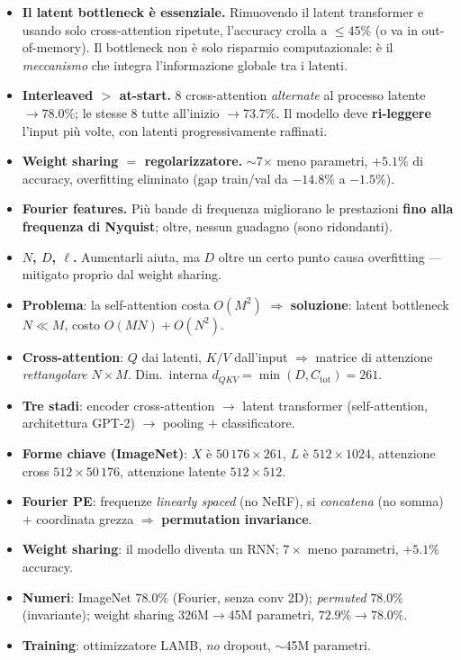 \documentclass[11pt]{article}
\begin{document}
\begin{itemize}
\item \textbf{Il latent bottleneck è essenziale.} Rimuovendo il latent transformer e usando solo cross-attention ripetute, l'accuracy crolla a $\le 45\%$ (o va in out-of-memory). Il bottleneck non è solo risparmio computazionale: è il \emph{meccanismo} che integra l'informazione globale tra i latenti.
\item \textbf{Interleaved $>$ at-start.} $8$ cross-attention \emph{alternate} al processo latente $\to 78.0\%$; le stesse $8$ tutte all'inizio $\to 73.7\%$. Il modello deve \textbf{ri-leggere} l'input più volte, con latenti progressivamente raffinati.
\item \textbf{Weight sharing $=$ regolarizzatore.} $\sim$7$\times$ meno parametri, $+5.1\%$ di accuracy, overfitting eliminato (gap train/val da $-14.8\%$ a $-1.5\%$).
\item \textbf{Fourier features.} Più bande di frequenza migliorano le prestazioni \textbf{fino alla frequenza di Nyquist}; oltre, nessun guadagno (sono ridondanti).
\item \textbf{$N$, $D$, $\ell$.} Aumentarli aiuta, ma $D$ oltre un certo punto causa overfitting --- mitigato proprio dal weight sharing.
\end{itemize}

\begin{esamebox}[title={\textbf{Da ricordare per l'esame}}]
\begin{itemize}
\item \textbf{Problema}: la self-attention costa $O(M^2)$ $\Rightarrow$ \textbf{soluzione}: latent bottleneck $N \ll M$, costo $O(MN) + O(N^2)$.
\item \textbf{Cross-attention}: $Q$ dai latenti, $K/V$ dall'input $\Rightarrow$ matrice di attenzione \emph{rettangolare} $N \times M$. Dim.\ interna $d_{QKV} = \min(D, C_{\text{tot}}) = 261$.
\item \textbf{Tre stadi}: encoder cross-attention $\to$ latent transformer (self-attention, architettura GPT-2) $\to$ pooling $+$ classificatore.
\item \textbf{Forme chiave (ImageNet)}: $X$ è $50\,176{\times}261$, $L$ è $512{\times}1024$, attenzione cross $512{\times}50\,176$, attenzione latente $512{\times}512$.
\item \textbf{Fourier PE}: frequenze \emph{linearly spaced} (no NeRF), si \emph{concatena} (no somma) $+$ coordinata grezza $\Rightarrow$ \textbf{permutation invariance}.
\item \textbf{Weight sharing}: il modello diventa un RNN; $7\times$ meno parametri, $+5.1\%$ accuracy.
\item \textbf{Numeri}: ImageNet $78.0\%$ (Fourier, senza conv 2D); \emph{permuted} $78.0\%$ (invariante); weight sharing $326$M$\to$45M parametri, $72.9\%\to78.0\%$.
\item \textbf{Training}: ottimizzatore LAMB, \emph{no} dropout, $\sim$45M parametri.
\end{itemize}
\end{esamebox}
\end{document}
